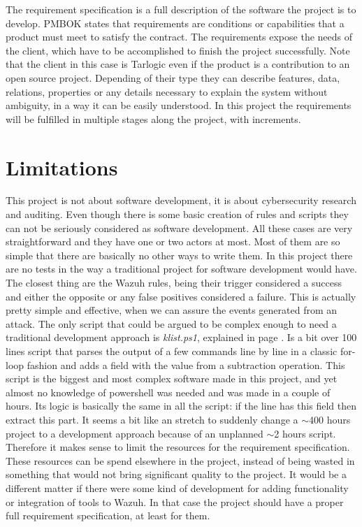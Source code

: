 
The requirement specification is a full description of the software the project is to develop.
\linej
PMBOK\cite{pmbok} states that requirements are conditions or capabilities that a product must meet to satisfy the contract.
The requirements expose the needs of the client, which have to be accomplished to finish the project successfully.
Note that the client in this case is Tarlogic even if the product is a contribution to an open source project.
\linej
Depending of their type they can describe features, data, relations, properties or any details necessary to explain the system without ambiguity, in a way it can be easily understood.
\linej
\linej
In this project the requirements will be fulfilled in multiple stages along the project, with increments.

\section{Limitations}
This project is not about software development, it is about cybersecurity research and auditing.
\linej
Even though there is some basic creation of rules and scripts they can not be seriously considered as software development.
All these cases are very straightforward and they have one or two actors at most.
Most of them are so simple that there are basically no other ways to write them.
\linej
\linej
In this project there are no tests in the way a traditional project for software development would have.
The closest thing are the Wazuh rules, being their trigger considered a success and either the opposite or any false positives considered a failure.
This is actually pretty simple and effective, when we can assure the events generated from an attack.
\linej
\linej
The only script that could be argued to be complex enough to need a traditional development approach is \textit{klist.ps1}\cite{memoria_github}, explained in page \pageref{klist_detection}. Is a bit over 100 lines script that parses the output of a few commands line by line in a classic for-loop fashion and adds a field with the value from a subtraction operation.
\linej
This script is the biggest and most complex software made in this project, and yet almost no knowledge of powershell was needed and was made in a couple of hours.
Its logic is basically the same in all the script: if the line has this field then extract this part.
\linej
It seems a bit like an stretch to suddenly change a $\sim$400 hours project to a development approach because of an unplanned $\sim$2 hours script.
\linej
\linej
Therefore it makes sense to limit the resources for the requirement specification. These resources can be spend elsewhere in the project, instead of being wasted in something that would not bring significant quality to the project.
\linej
It would be a different matter if there were some kind of development for adding functionality or integration of tools to Wazuh. In that case the project should have a proper full requirement specification, at least for them.

